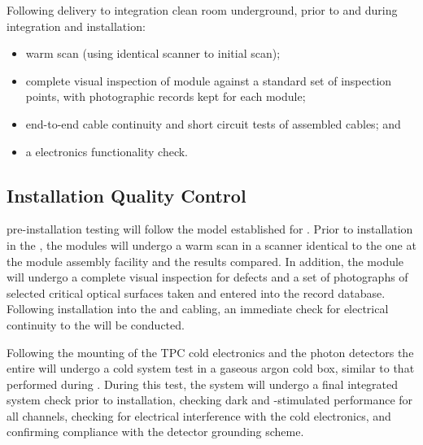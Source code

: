Following delivery to integration clean room underground, prior to and during integration and installation:
\begin{itemize}
\item warm scan (using identical scanner to initial scan);
\item complete visual inspection of module against a standard set of inspection points, with photographic records kept for each module;
\item end-to-end cable continuity and short circuit tests of assembled cables; and
\item a  electronics functionality check.
\end{itemize}

\subsection{Installation Quality Control}
\label{sec:fdsp-pd-installqc}

 pre-installation testing will follow the model established for .  Prior to installation in the , the  modules will undergo a warm scan in a scanner identical to the one at the  module assembly facility and the results compared.  In addition, the module will undergo a complete visual inspection for defects and a set of photographs of selected critical optical surfaces taken and entered into the  record database.  Following installation into the  and cabling, an immediate check for electrical continuity to the  will be conducted.

Following the mounting of the TPC cold electronics and the photon detectors the entire  will undergo a cold system test in a gaseous argon cold box, similar to that performed during .  During this test, the  system will undergo a final integrated system check prior to installation, checking dark and -stimulated  performance for all channels, checking for electrical interference with the cold electronics, and confirming compliance with the detector grounding scheme.
